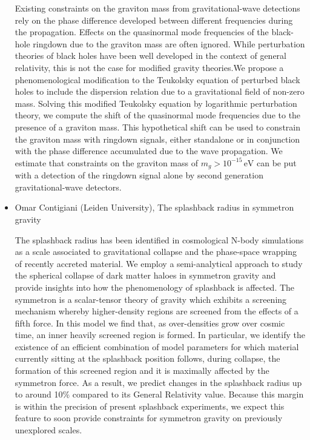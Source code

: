 \documentclass[letterpaper,12pt]{article}
\newcommand{\talk}[2]{{\fontspec{Lato Bold} #1,} {\fontspec{Lato Italic} #2}}
\begin{document}
\begin{itemize}
Existing constraints on the graviton mass from gravitational-wave detections rely on the phase difference developed between different frequencies during the propagation. Effects on the quasinormal mode frequencies of the black-hole ringdown due to the graviton mass are often ignored. While perturbation theories of black holes have been well developed in the context of general relativity, this is not the case for modified gravity theories.We propose a phenomenological modification to the Teukolsky equation of perturbed black holes to include the dispersion relation due to a gravitational field of non-zero mass. Solving this modified Teukolsky equation by logarithmic perturbation theory, we compute the shift of the quasinormal mode frequencies due to the presence of a graviton mass. This hypothetical shift can be used to constrain the graviton mass with ringdown signals, either standalone or in conjunction with the phase difference accumulated due to the wave propagation. We estimate that constraints on the graviton mass of $m_g > 10^{-15}\,\textrm{eV}$ can be put with a detection of the ringdown signal alone by second generation gravitational-wave detectors.


\item \talk{Omar Contigiani (Leiden University)}{The splashback radius in symmetron gravity}

The splashback radius has been identified in cosmological N-body simulations as a scale associated to gravitational collapse and the phase-space wrapping of recently accreted material.  We employ a semi-analytical approach to study the spherical collapse of dark matter haloes in symmetron gravity and provide insights into how the phenomenology of splashback is affected.  The symmetron is a scalar-tensor theory of gravity which exhibits a screening mechanism whereby higher-density regions are  screened  from  the  effects  of  a  fifth  force.  In  this  model  we  find that,  as  over-densities  grow  over cosmic  time,  an  inner  heavily  screened  region  is  formed.   In  particular,  we  identify  the  existence of an efficient combination of model parameters for which material currently sitting at the splashback position follows, during collapse, the formation of this screened region and it is maximally affected by the symmetron force.  As  a  result,  we  predict  changes  in the splashback  radius up  to around 10\% compared  to its General  Relativity value.  Because this margin is within the precision of present splashback experiments, we expect this feature to soon provide constraints for symmetron gravity on previously unexplored scales.



\end{itemize}
\end{document}

